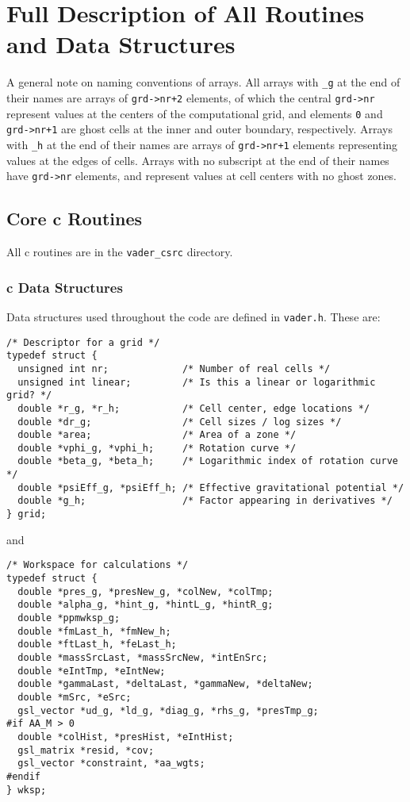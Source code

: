 \documentclass[12pt]{article}
\begin{document}
\section{Full Description of All Routines and Data Structures}

A general note on naming conventions of arrays. All arrays with \verb=_g= at the end of their names are arrays of \verb=grd->nr+2= elements, of which the central \verb=grd->nr= represent values at the centers of the computational grid, and elements \verb=0= and \verb=grd->nr+1= are ghost cells at the inner and outer boundary, respectively. Arrays with \verb=_h= at the end of their names are arrays of \verb=grd->nr+1= elements representing values at the edges of cells. Arrays with no subscript at the end of their names have \verb=grd->nr= elements, and represent values at cell centers with no ghost zones.

\subsection{Core c Routines}
\label{ssec:cAPI}

All c routines are in the \verb=vader_csrc= directory.

\subsubsection{c Data Structures}
\label{sssec:datastructures}

Data structures used throughout the code are defined in \texttt{vader.h}. These are:

\begin{verbatim}
/* Descriptor for a grid */
typedef struct {
  unsigned int nr;             /* Number of real cells */
  unsigned int linear;         /* Is this a linear or logarithmic grid? */
  double *r_g, *r_h;           /* Cell center, edge locations */
  double *dr_g;                /* Cell sizes / log sizes */
  double *area;                /* Area of a zone */
  double *vphi_g, *vphi_h;     /* Rotation curve */
  double *beta_g, *beta_h;     /* Logarithmic index of rotation curve */
  double *psiEff_g, *psiEff_h; /* Effective gravitational potential */
  double *g_h;                 /* Factor appearing in derivatives */
} grid;
\end{verbatim}

and

\begin{verbatim}
/* Workspace for calculations */
typedef struct {
  double *pres_g, *presNew_g, *colNew, *colTmp;
  double *alpha_g, *hint_g, *hintL_g, *hintR_g;
  double *ppmwksp_g;
  double *fmLast_h, *fmNew_h;
  double *ftLast_h, *feLast_h;
  double *massSrcLast, *massSrcNew, *intEnSrc;
  double *eIntTmp, *eIntNew;
  double *gammaLast, *deltaLast, *gammaNew, *deltaNew;
  double *mSrc, *eSrc;
  gsl_vector *ud_g, *ld_g, *diag_g, *rhs_g, *presTmp_g;
#if AA_M > 0
  double *colHist, *presHist, *eIntHist;
  gsl_matrix *resid, *cov;
  gsl_vector *constraint, *aa_wgts;
#endif
} wksp;
\end{verbatim}
\end{document}
